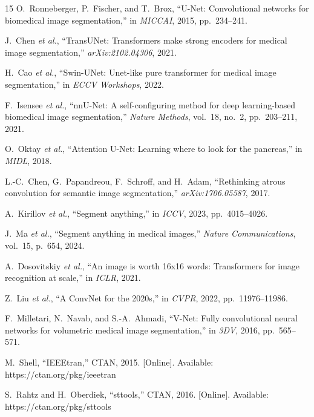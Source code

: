 \documentclass[journal,twocolumn]{IEEEtran}   %
\begin{document}
\FloatBarrier
{}
\begin{thebibliography}{15}
O.~Ronneberger, P.~Fischer, and T.~Brox, ``U-Net: Convolutional networks
for biomedical image segmentation,'' in \emph{MICCAI}, 2015, pp.~234--241.

J.~Chen \emph{et al.}, ``TransUNet: Transformers make strong encoders
for medical image segmentation,'' \emph{arXiv:2102.04306}, 2021.

H.~Cao \emph{et al.}, ``Swin-UNet: Unet-like pure transformer for
medical image segmentation,'' in \emph{ECCV Workshops}, 2022.

F.~Isensee \emph{et al.}, ``nnU-Net: A self-configuring method for deep
learning-based biomedical image segmentation,'' \emph{Nature Methods},
vol.~18, no.~2, pp.~203--211, 2021.

O.~Oktay \emph{et al.}, ``Attention U-Net: Learning where to look for
the pancreas,'' in \emph{MIDL}, 2018.

L.-C.~Chen, G.~Papandreou, F.~Schroff, and H.~Adam, ``Rethinking atrous
convolution for semantic image segmentation,'' \emph{arXiv:1706.05587},
2017.

A.~Kirillov \emph{et al.}, ``Segment anything,'' in \emph{ICCV}, 2023,
pp.~4015--4026.

J.~Ma \emph{et al.}, ``Segment anything in medical images,''
\emph{Nature Communications}, vol.~15, p.~654, 2024.

A.~Dosovitskiy \emph{et al.}, ``An image is worth 16x16 words:
Transformers for image recognition at scale,'' in \emph{ICLR}, 2021.

Z.~Liu \emph{et al.}, ``A ConvNet for the 2020s,'' in \emph{CVPR},
2022, pp.~11976--11986.

F.~Milletari, N.~Navab, and S.-A.~Ahmadi, ``V-Net: Fully convolutional
neural networks for volumetric medical image segmentation,'' in
\emph{3DV}, 2016, pp.~565--571.

M.~Shell, ``IEEEtran,'' CTAN, 2015. [Online].
Available: https://ctan.org/pkg/ieeetran

S.~Rahtz and H.~Oberdiek, ``sttools,'' CTAN, 2016. [Online].
Available: https://ctan.org/pkg/sttools
\end{thebibliography}

\end{document}
